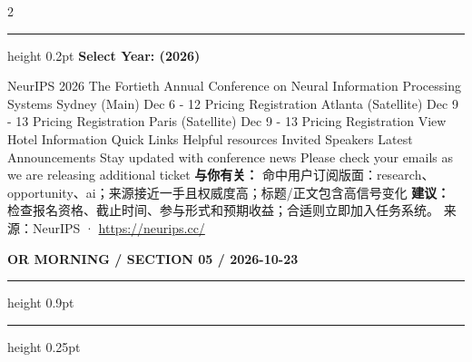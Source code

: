 \documentclass[10.5pt]{ctexart}
\begin{document}
\begin{multicols}{2}
\vspace{2mm}
\hrule height 0.2pt
\vspace{2mm}
{\large\bfseries Select Year: (2026)}\par
NeurIPS 2026 The Fortieth Annual Conference on Neural Information Processing Systems Sydney (Main) Dec 6 - 12 Pricing Registration Atlanta (Satellite) Dec 9 - 13 Pricing Registration Paris (Satellite) Dec 9 - 13 Pricing Registration View Hotel Information Quick Links Helpful resources Invited Speakers Latest Announcements Stay updated with conference news Please check your emails as we are releasing additional ticket
\textbf{与你有关：} 命中用户订阅版面：research、opportunity、ai；来源接近一手且权威度高；标题/正文包含高信号变化
\textbf{建议：} 检查报名资格、截止时间、参与形式和预期收益；合适则立即加入任务系统。
{\footnotesize\color{ormuted} 来源：NeurIPS · \url{https://neurips.cc/}}
\end{multicols}
\newpage
{\small\bfseries OR MORNING / SECTION 05 / 2026-10-23}
\vspace{2mm}
\hrule height 0.9pt
\vspace{1.5mm}
\hrule height 0.25pt
\vspace{4mm}
\end{document}
